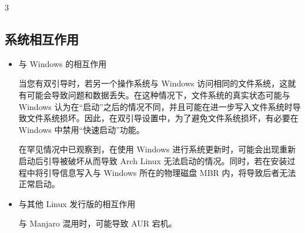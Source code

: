 \documentclass{article}
\begin{document}
\begin{multicols*}{3}








	\begin{tcolorbox}
	\section*{系统相互作用}
	\end{tcolorbox}
	\begin{itemize}[leftmargin=*]
		\setlength{\parindent}{0pt}

		\item 与 Windows 的相互作用

		当您有双引导时，若另一个操作系统与 Windows 访问相同的文件系统，这就有可能会导致问题和数据丢失。在这种情况下，文件系统的真实状态可能与 Windows 认为在“启动”之后的情况不同，并且可能在进一步写入文件系统时导致文件系统损坏。因此，在双引导设置中，为了避免文件系统损坏，有必要在 Windows 中禁用“快速启动”功能。

		在罕见情况中已观察到，在使用 Windows 进行系统更新时，可能会出现重新启动后引导被破坏从而导致 Arch Linux 无法启动的情况。同时，若在安装过程中将引导信息写入与 Windows 所在的物理磁盘 MBR 内，将导致后者无法正常启动。

		\item 与其他 Linux 发行版的相互作用

		与 Manjaro 混用时，可能导致 AUR 宕机。

	\end{itemize}


	\begin{tcolorbox}

\end{tcolorbox}
\end{multicols*}
\end{document}
